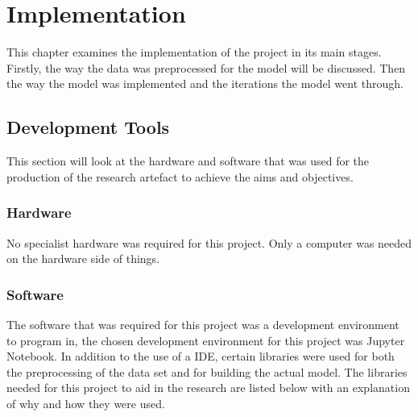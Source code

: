 \chapter{Implementation}\label{ch:Implementation}

This chapter examines the implementation of the project in its main stages. Firstly, the way the data was preprocessed for the model will be discussed. Then the way the model was implemented and the iterations the model went through. 

\section{Development Tools}
This section will look at the hardware and software that was used for the production of the research artefact to achieve the aims and objectives.
\subsection{Hardware}
No specialist hardware was required for this project. Only a computer was needed on the hardware side of things.
\subsection{Software}  
The software that was required for this project was a development environment to program in, the chosen development environment for this project was Jupyter Notebook. In addition to the use of a IDE, certain libraries were used for both the preprocessing of the data set and for building the actual model. The libraries needed for this project to aid in the research are listed below with an explanation of why and how they were used.
